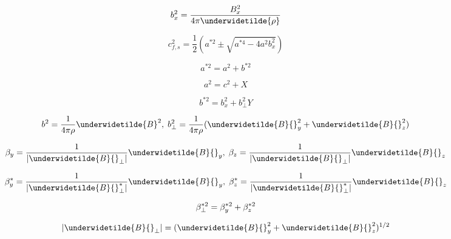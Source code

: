 \begin{equation}
b_{x}^2 = \frac{B_{x}^2}{4 \pi \underwidetilde{\rho}}
\vspace{-8pt} 
\end{equation}

\begin{equation}
c_{f,s}^2 = \frac12 \left( a^{\ast 2} \pm \sqrt{a^{\ast 4} 
- 4 a^2 b_x^2}\right)
\end{equation}

\begin{equation}
a^{\ast 2} = a^2 + b^{\ast 2}
\end{equation}

\begin{equation}
a^2 = c^2 + X
\end{equation}

\begin{equation}
b^{\ast 2} = b_x^2 + b_{\bot}^2 Y
\end{equation}

\begin{equation}
b^2 = \frac1{4 \pi \rho} \underwidetilde{B}^2, \;
b_{\bot}^2 = \frac1{4 \pi \rho} ( \underwidetilde{B}{}_{y}^2 + 
\underwidetilde{B}{}_{z}^2 )
\end{equation}

\newpage

\begin{equation}
\beta_{y} = \frac1{| \underwidetilde{B}{}_{\bot} |} \underwidetilde{B}{}_{y}
, \;
\beta_{z} = \frac1{| \underwidetilde{B}{}_{\bot} |} \underwidetilde{B}{}_{z}
\vspace{-8pt}
\end{equation}

\begin{equation}
\beta_{y}^{\ast} = \frac1{| \underwidetilde{B}{}^{\ast}_{\bot} |} \underwidetilde{B}{}_{y}
, \;
\beta_{z}^{\ast} = \frac1{| \underwidetilde{B}{}^{\ast}_{\bot} |} \underwidetilde{B}{}_{z}
\vspace{-8pt}
\end{equation}

\begin{equation}
\beta_{\bot}^{\ast 2} = \beta_y^{\ast 2} + \beta_z^{\ast 2}
\vspace{-8pt}
\end{equation}

\begin{equation}
| \underwidetilde{B}{}_{\bot} | = ( \underwidetilde{B}{}_{y}^{2} +
\underwidetilde{B}{}_{z}^{2} ) ^{1/2}
\vspace{-8pt}
\end{equation}


